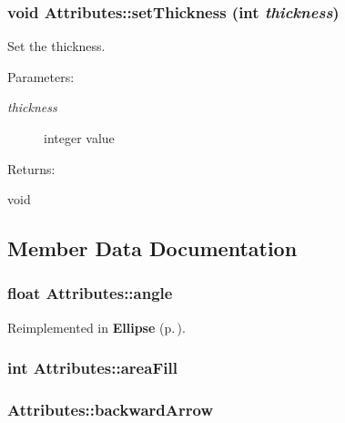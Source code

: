 \subsubsection{\setlength{\rightskip}{0pt plus 5cm}void Attributes::set\-Thickness (int {\em thickness})\hspace{0.3cm}{\tt  [inline]}}\label{classAttributes_a3}


Set the thickness. \begin{Desc}
\item[Parameters: ]\par
\begin{description}
\item[{\em 
thickness}]integer value \end{description}
\end{Desc}
\begin{Desc}
\item[Returns: ]\par
void \end{Desc}


\subsection{Member Data Documentation}
\subsubsection{\setlength{\rightskip}{0pt plus 5cm}float Attributes::angle\hspace{0.3cm}{\tt  [protected]}}\label{classAttributes_n13}




Reimplemented in {\bf Ellipse} {\rm (p.\,\pageref{classEllipse_n2})}.
\subsubsection{\setlength{\rightskip}{0pt plus 5cm}int Attributes::area\-Fill\hspace{0.3cm}{\tt  [protected]}}\label{classAttributes_n6}


\subsubsection{ Attributes::backward\-Arrow\hspace{0.3cm}{\tt  [protected]}}\label{classAttributes_n20}


